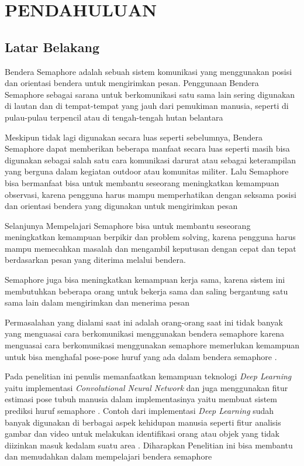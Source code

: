 \chapter{PENDAHULUAN}

\section{Latar Belakang}

Bendera Semaphore adalah sebuah sistem komunikasi yang menggunakan posisi dan orientasi bendera untuk mengirimkan pesan. Penggunaan Bendera Semaphore sebagai sarana untuk berkomunikasi satu sama lain sering digunakan di lautan dan di tempat-tempat yang jauh dari pemukiman manusia, seperti di pulau-pulau terpencil atau di tengah-tengah hutan belantara

Meskipun tidak lagi digunakan secara luas seperti sebelumnya, Bendera Semaphore dapat memberikan beberapa manfaat secara luas seperti  masih bisa digunakan sebagai salah satu cara komunikasi darurat atau sebagai keterampilan yang berguna dalam kegiatan outdoor atau komunitas militer. Lalu Semaphore bisa bermanfaat bisa untuk membantu seseorang meningkatkan kemampuan observasi, karena pengguna harus mampu memperhatikan dengan seksama posisi dan orientasi bendera yang digunakan untuk mengirimkan pesan

Selanjunya Mempelajari Semaphore bisa untuk  membantu seseorang meningkatkan kemampuan berpikir dan problem solving, karena pengguna harus mampu memecahkan masalah dan mengambil keputusan dengan cepat dan tepat berdasarkan pesan yang diterima melalui bendera. 

Semaphore juga bisa meningkatkan kemampuan kerja sama, karena sistem ini membutuhkan beberapa orang untuk bekerja sama dan saling bergantung satu sama lain dalam mengirimkan dan menerima pesan

Permasalahan yang dialami saat ini adalah orang-orang saat ini tidak banyak yang menguasai cara berkomunikasi menggunakan bendera semaphore karena menguasai cara berkomunikasi menggunakan semaphore memerlukan kemampuan untuk bisa menghafal pose-pose huruf yang ada dalam bendera semaphore . 

Pada penelitian ini penulis memanfaatkan kemampuan teknologi \textit{Deep Learning} yaitu implementasi \textit{Convolutional Neural Network} dan juga menggunakan fitur estimasi pose tubuh manusia dalam implementasinya yaitu membuat sistem prediksi huruf semaphore . Contoh dari implementasi \textit{Deep Learning} sudah banyak digunakan di berbagai aspek kehidupan manusia seperti fitur analisis gambar dan video untuk melakukan identifikasi orang atau objek yang tidak diizinkan masuk kedalam suatu area . Diharapkan Penelitian ini bisa membantu dan memudahkan dalam mempelajari bendera semaphore

